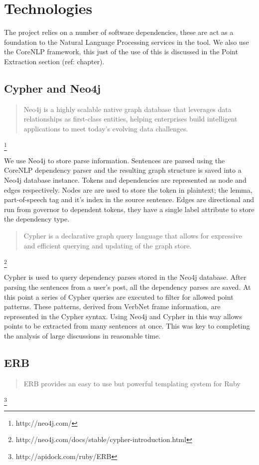 \chapter{Technologies\label{chap:technologies}}
  The project relies on a number of software dependencies, these are act as a foundation to the Natural Language Processing services in the tool. We also use the CoreNLP framework, this just of the use of this is discussed in the Point Extraction section (ref: chapter).

  \tocless\section{Cypher and Neo4j}
    \blockquote{Neo4j is a highly scalable native graph database that leverages data relationships as first-class entities, helping enterprises build intelligent applications to meet today's evolving data challenges.} \footnote{http://neo4j.com/}

    We use Neo4j to store parse information. Sentences are parsed using the CoreNLP dependency parser and the resulting graph structure is saved into a Neo4j database instance. Tokens and dependencies are represented as node and edges respectively. Nodes are are used to store the token in plaintext; the lemma, part-of-speech tag and it's index in the source sentence. Edges are directional and run from governor to dependent tokens, they have a single label attribute to store the dependency type.

    \blockquote{Cypher is a declarative graph query language that allows for expressive and efficient querying and updating of the graph store.} \footnote{http://neo4j.com/docs/stable/cypher-introduction.html}

    Cypher is used to query dependency parses stored in the Neo4j database. After parsing the sentences from a user's post, all the dependency parses are saved. At this point a series of Cypher queries are executed to filter for allowed point patterns. These patterns, derived from VerbNet frame information, are represented in the Cypher syntax. Using Neo4j and Cypher in this way allows points to be extracted from many sentences at once. This was key to completing the analysis of large discussions in reasonable time.

  \tocless\section{ERB}
    \blockquote{ERB provides an easy to use but powerful templating system for Ruby} \footnote{http://apidock.com/ruby/ERB}

